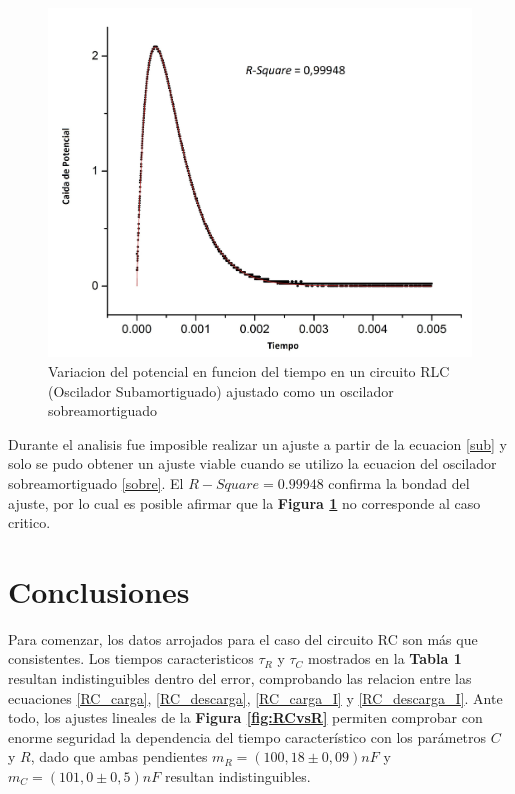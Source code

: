 \documentclass[11pt,a4paper]{article}
\begin{document}
\begin{figure}[H]
\centering
\includegraphics[scale=0.45]{RLC-Amortiguado_Critico(MasPiola)}
  \caption{Variacion del potencial en funcion del tiempo en un circuito RLC (Oscilador Subamortiguado) ajustado como un oscilador sobreamortiguado}
  \label{fig:RLC-sA}
\end{figure}

Durante el analisis fue imposible realizar un ajuste a partir de la ecuacion \eqref{sub} y solo se pudo obtener un ajuste viable cuando se utilizo la ecuacion del oscilador sobreamortiguado \eqref{sobre}. El $R-Square = 0.99948$ confirma la bondad del ajuste, por lo cual es posible afirmar que la \textbf{Figura \ref{fig:RLC-sA}} no corresponde al caso critico.




\section{Conclusiones}
\label{sec:conclusiones}

Para comenzar, los datos arrojados para el caso del circuito RC son más que consistentes. Los tiempos caracteristicos $\tau_R$ y $\tau_C$ mostrados en la \textbf{Tabla 1} resultan indistinguibles dentro del error, comprobando las relacion entre las ecuaciones \eqref{RC_carga}, \eqref{RC_descarga}, \eqref{RC_carga_I} y \eqref{RC_descarga_I}. Ante todo, los ajustes lineales de la \textbf{Figura \ref{fig:RCvsR}} permiten comprobar con enorme seguridad la dependencia del tiempo característico con los parámetros $C$ y $R$, dado que ambas pendientes $m_R = (100,18 \pm 0,09)nF$ y $m_C = (101,0 \pm 0,5)nF$ resultan indistinguibles.
\end{document}
